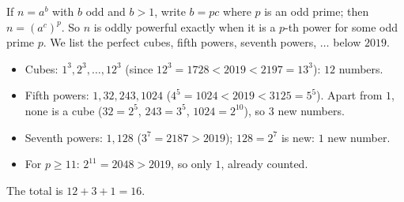 If $n=a^b$ with $b$ odd and $b>1$, write $b=pc$ where $p$ is an odd prime; then $n=(a^c)^p$. So $n$ is oddly powerful exactly when it is a $p$-th power for some odd prime $p$. We list the perfect cubes, fifth powers, seventh powers, $\dots$ below $2019$.
\begin{itemize}
\item Cubes: $1^3,2^3,\dots,12^3$ (since $12^3=1728<2019<2197=13^3$): $12$ numbers.
\item Fifth powers: $1,32,243,1024$ ($4^5=1024<2019<3125=5^5$). Apart from $1$, none is a cube ($32=2^5$, $243=3^5$, $1024=2^{10}$), so $3$ new numbers.
\item Seventh powers: $1,128$ ($3^7=2187>2019$); $128=2^7$ is new: $1$ new number.
\item For $p\ge11$: $2^{11}=2048>2019$, so only $1$, already counted.
\end{itemize}
The total is $12+3+1=\boxed{16}$.
